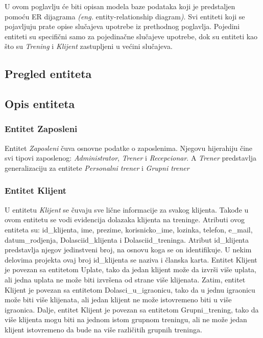 \documentclass[../main.tex]{subfiles}
\begin{document}
U ovom poglavlju će biti opisan modela baze podataka koji je predstaljen pomoću ER dijagrama \textit{(eng.} entity-relationship diagram\textit{)}. Svi entiteti koji se pojavljuju prate opise slučajeva upotrebe iz prethodnog poglavlja. Pojedini entiteti su specifični samo za pojedinačne slučajeve upotrebe, dok su entiteti kao što su \textit{Trening} i \textit{Klijent} zastupljeni u većini slučajeva. 

\subsection{Pregled entiteta}


\subsection{Opis entiteta}


\subsubsection{Entitet Zaposleni}

Entitet \textit{Zaposleni} čuva osnovne podatke o zaposlenima. Njegovu hijerahiju čine svi tipovi zaposlenog: \textit{Administrator}, \textit{Trener} i \textit{Recepcionar}. A \textit{Trener} predstavlja generalizaciju za entitete \textit{Personalni trener} i \textit{Grupni trener}


\subsubsection{Entitet Klijent}
U entitetu \textit{Klijent} se čuvaju sve lične informacije za svakog klijenta. Takođe u ovom entitetu se vodi evidencija dolazaka klijenta na treninge. Atributi ovog entiteta su: id\_klijenta, ime, prezime, korisnicko\_ime, lozinka, telefon, e\_mail, datum\_rodjenja, Dolasciid\_klijenta i  Dolasciid\_treninga.
Atribut id\_klijenta predstavlja njegov jedinstveni broj, na osnovu koga se on identifikuje. U nekim delovima projekta ovaj broj id\_klijenta se naziva i članska karta. Entitet Klijent je povezan sa entitetom Uplate, tako da jedan klijent može da izvrši više uplata, ali jedna uplata ne može biti izvršena od strane više klijenata. Zatim, entitet Klijent je povezan sa entitetom Dolasci\_u\_igraonicu, tako da u jednu igraonicu može biti više klijenata, ali jedan klijent ne može istovremeno biti u više igraonica. Dalje, entitet Klijent je povezan sa entitetom Grupni\_trening, tako da više klijenta mogu biti na jednom istom grupnom treningu, ali ne može jedan klijent istovremeno da bude na više različitih grupnih treninga.
\end{document}
